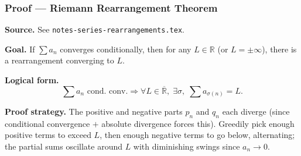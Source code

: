 

\clearpage
{}
\hypertarget{proof-RA-ABB-T-riemann-rearrangement}{}

\subsubsection[Riemann Rearrangement Theorem]{Proof --- Riemann Rearrangement Theorem}

\bigskip

\noindent
\textbf{Source.} See \texttt{notes-series-rearrangements.tex}.

\vspace{0.75em}

\noindent
\textbf{Goal.} If $\sum a_n$ converges conditionally, then for any $L \in \mathbb{R}$ (or $L = \pm\infty$), there is a rearrangement converging to $L$.

\vspace{0.75em}

\noindent
\textbf{Logical form.}
\[
  \sum a_n \text{ cond. conv.} \Rightarrow \forall L \in \overline{\mathbb{R}},\; \exists \sigma,\; \sum a_{\sigma(n)} = L.
\]

\vspace{0.75em}

\noindent
\textbf{Proof strategy.} The positive and negative parts $p_n$ and $q_n$ each diverge (since conditional convergence $+$ absolute divergence forces this). Greedily pick enough positive terms to exceed $L$, then enough negative terms to go below, alternating; the partial sums oscillate around $L$ with diminishing swings since $a_n \to 0$.

\vspace{0.75em}

